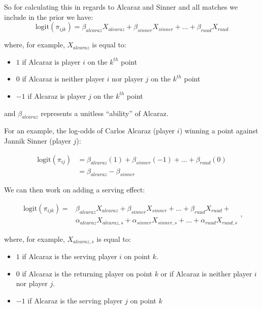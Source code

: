 \documentclass[
  letterpaper,
  DIV=11,
  numbers=noendperiod]{scrartcl}
\providecommand{\tightlist}{%
  \setlength{\itemsep}{0pt}\setlength{\parskip}{0pt}}\usepackage{longtable,booktabs,array}
\begin{document}
So for calculating this in regards to Alcaraz and Sinner and all matches
we include in the prior we have:
\[\text{logit}(\pi_{ijk}) = \beta_{alcaraz}X_{alcaraz} + \beta_{sinner}X_{sinner} + \ldots + \beta_{ruud}X_{ruud}\]

where, for example, \(X_{alcaraz}\) is equal to:

\begin{itemize}
\tightlist
\item
  \(1\) if Alcaraz is player \(i\) on the \(k^{th}\) point
\item
  \(0\) if Alcaraz is neither player \(i\) nor player \(j\) on the
  \(k^{th}\) point
\item
  \(-1\) if Alcaraz is player \(j\) on the \(k^{th}\) point
\end{itemize}

and \(\beta_{alcaraz}\) represents a unitless ``ability'' of Alcaraz.

For an example, the log-odds of Carlos Alcaraz (player \(i\)) winning a
point against Jannik Sinner (player \(j\)):

\begin{equation}
  \begin{aligned}
    \text{logit}(\pi_{ij}) & = \beta_{alcaraz}(1) + \beta_{sinner}(-1) + \ldots + \beta_{ruud}(0) \\
                                 & = \beta_{alcaraz} - \beta_{sinner}
  \end{aligned}
\end{equation}

We can then work on adding a serving effect:

\begin{equation}
  \begin{aligned}
    \text{logit}(\pi_{ijk}) = & \beta_{alcaraz}X_{alcaraz} + \beta_{sinner}X_{sinner} + \ldots + \beta_{ruud}X_{ruud} + \\
    & \alpha_{alcaraz}X_{alcaraz,s} + \alpha_{sinner}X_{sinner,s} + \ldots + \alpha_{ruud}X_{ruud,s}
  \end{aligned},
\end{equation}

where, for example, \(X_{alcaraz,s}\) is equal to:

\begin{itemize}
\tightlist
\item
  \(1\) if Alcaraz is the serving player \(i\) on point \(k\).
\item
  \(0\) if Alcaraz is the returning player on point \(k\) or if Alcaraz
  is neither player \(i\) nor player \(j\).
\item
  \(-1\) if Alcaraz is the serving player \(j\) on point \(k\)
\end{itemize}
\end{document}

